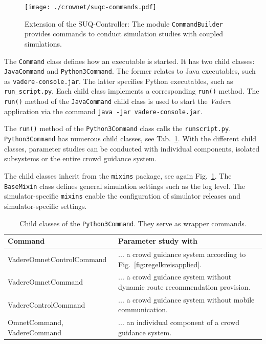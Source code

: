 \begin{figure}[hbt!]
\texttt{[image: ./crownet/suqc-commands.pdf]} 
\caption[SUQ-Controller: sub-package CommandBuilder]{Extension of the SUQ-Controller: The module \lstinline{CommandBuilder} provides commands to conduct simulation studies with coupled simulations. }
\label{fig:commandbuilder}
\end{figure}

The \lstinline{Command} class defines how an executable is started. It has two child classes: \lstinline{JavaCommand} and \lstinline{Python3Command}. The former relates to Java executables, such as \lstinline{vadere-console.jar}. The latter specifies Python executables, such as \lstinline{run_script.py}. Each child class implements a corresponding \lstinline{run()} method. The \lstinline{run()}  method of the \lstinline{JavaCommand} child class is used to start the \textit{Vadere} application via the command \lstinline{java -jar vadere-console.jar}. 

The \lstinline{run()} method of the \lstinline{Python3Command} class calls the \lstinline{runscript.py}. \lstinline{Python3Command} has numerous child classes,  see Tab.~\ref{tab:wrappercommands}. With the different child classes, parameter studies can be conducted with individual components, isolated subsystems or the entire crowd guidance system.

The child classes inherit from the \lstinline{mixins} package, see again Fig.~\ref{fig:commandbuilder}. The \lstinline{BaseMixin} class defines general simulation settings such as the log level. The simulator-specific  \lstinline{mixins}  enable the configuration of simulator releases and simulator-specific settings.


\begin{table}[hbt]
\begin{tabular}{p{6cm}p{7.5cm}}
\hline 
Command  & Parameter study with \\ \hline
 {VadereOmnetControlCommand}& ... a crowd guidance system according to Fig.~\ref{fig:regelkreisapplied}.\\
VadereOmnetCommand &  ... a crowd guidance system without dynamic route recommendation provision. \\
VadereControlCommand& ... a crowd guidance system without mobile communication. \\
 {OmnetCommand}, {VadereCommand} & ... an individual component of a crowd guidance system.\\
\hline
\end{tabular} 
\caption{Child classes of the \lstinline{Python3Command}. They serve as wrapper commands.}
\label{tab:wrappercommands}
\end{table}












